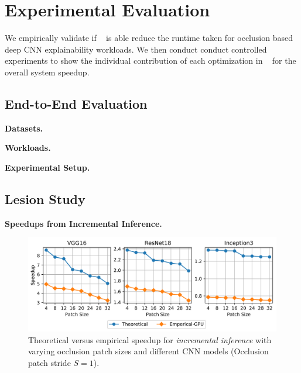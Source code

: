 \section{Experimental Evaluation}
We empirically validate if \system~ is able reduce the runtime taken for occlusion based deep CNN explainability workloads.
We then conduct conduct controlled experiments to show the individual contribution of each optimization in \system~ for the overall system speedup.

\subsection{End-to-End Evaluation}

\vspace{2mm}
\noindent \textbf{Datasets.}

\vspace{2mm}
\noindent \textbf{Workloads.}

\vspace{2mm}
\noindent \textbf{Experimental Setup.}

\subsection{Lesion Study}

\vspace{2mm}
\noindent \textbf{Speedups from Incremental Inference.}
\begin{figure}[t]
\includegraphics[width=\columnwidth]{images/5_2_1_GPU}
\caption{Theoretical versus empirical speedup for \textit{incremental inference} with varying occlusion patch sizes and different CNN models (Occlusion patch stride $S=1$).}
\label{fig:5_2_1_GPU}
\end{figure}

